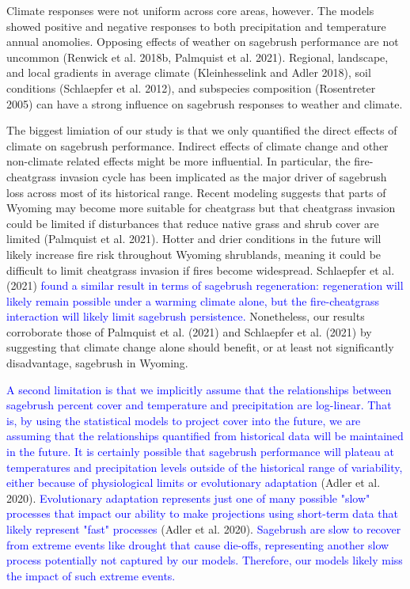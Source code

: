 \documentclass[
  12pt,
]{article}
\begin{document}
Climate responses were not uniform across core areas, however.
The models showed positive and negative responses to both precipitation and temperature annual anomolies.
Opposing effects of weather on sagebrush performance are not uncommon (Renwick et al. 2018b, Palmquist et al. 2021).
Regional, landscape, and local gradients in average climate (Kleinhesselink and Adler 2018), soil conditions (Schlaepfer et al. 2012), and subspecies composition (Rosentreter 2005) can have a strong influence on sagebrush responses to weather and climate.

The biggest limiation of our study is that we only quantified the direct effects of climate on sagebrush performance.
Indirect effects of climate change and other non-climate related effects might be more influential.
In particular, the fire-cheatgrass invasion cycle has been implicated as the major driver of sagebrush loss across most of its historical range.
Recent modeling suggests that parts of Wyoming may become more suitable for cheatgrass but that cheatgrass invasion could be limited if disturbances that reduce native grass and shrub cover are limited (Palmquist et al. 2021).
Hotter and drier conditions in the future will likely increase fire risk throughout Wyoming shrublands, meaning it could be difficult to limit cheatgrass invasion if fires become widespread.
Schlaepfer et al. (2021) \textcolor{blue}{found a similar result in terms of sagebrush regeneration: regeneration will likely remain possible under a warming climate alone, but the fire-cheatgrass interaction will likely limit sagebrush persistence.}
Nonetheless, our results corroborate those of Palmquist et al. (2021) and Schlaepfer et al. (2021) by suggesting that climate change alone should benefit, or at least not significantly disadvantage, sagebrush in Wyoming.

\textcolor{blue}{A second limitation is that we implicitly assume that the relationships between sagebrush percent cover and temperature and precipitation are log-linear.
That is, by using the statistical models to project cover into the future, we are assuming that the relationships quantified from historical data will be maintained in the future.
It is certainly possible that sagebrush performance will plateau at temperatures and precipitation levels outside of the historical range of variability, either because of physiological limits or evolutionary adaptation} (Adler et al. 2020).
\textcolor{blue}{Evolutionary adaptation represents just one of many possible "slow" processes that impact our ability to make projections using short-term data that likely represent "fast" processes} (Adler et al. 2020).
\textcolor{blue}{Sagebrush are slow to recover from extreme events like drought that cause die-offs, representing another slow process potentially not captured by our models.}
\textcolor{blue}{Therefore, our models likely miss the impact of such extreme events.}
\end{document}
